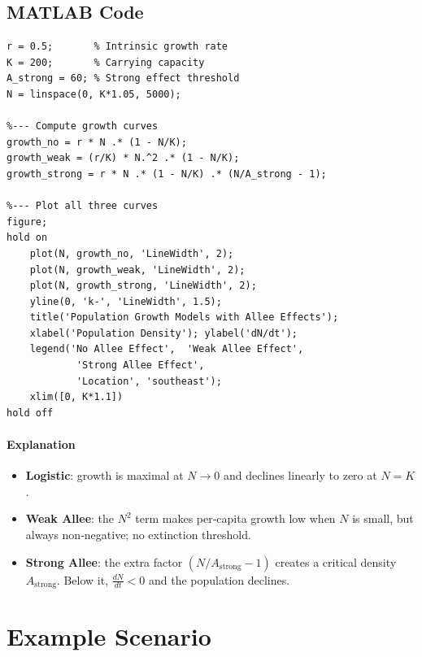 \documentclass{article}
\begin{document}
\subsection{MATLAB Code}
\begin{lstlisting}[caption={Analyze simulation results (Calculation part)}]
%--- Model parameters and density vector
r = 0.5;       % Intrinsic growth rate
K = 200;       % Carrying capacity
A_strong = 60; % Strong effect threshold
N = linspace(0, K*1.05, 5000);

%--- Compute growth curves
growth_no = r * N .* (1 - N/K);
growth_weak = (r/K) * N.^2 .* (1 - N/K);
growth_strong = r * N .* (1 - N/K) .* (N/A_strong - 1);

%--- Plot all three curves
figure;
hold on
    plot(N, growth_no, 'LineWidth', 2);
    plot(N, growth_weak, 'LineWidth', 2);
    plot(N, growth_strong, 'LineWidth', 2);
    yline(0, 'k-', 'LineWidth', 1.5); 
    title('Population Growth Models with Allee Effects');
    xlabel('Population Density'); ylabel('dN/dt');
    legend('No Allee Effect',  'Weak Allee Effect',
            'Strong Allee Effect', 
            'Location', 'southeast');
    xlim([0, K*1.1])
hold off
\end{lstlisting}

\paragraph{Explanation}
\begin{itemize}
  \item \textbf{Logistic}: growth is maximal at \(N\!\to\!0\) and declines linearly to zero at \(N=K\).
  \item \textbf{Weak Allee}: the \(N^2\) term makes per‐capita growth low when \(N\) is small, but always non‐negative; no extinction threshold.
  \item \textbf{Strong Allee}: the extra factor \((N/A_\text{strong}-1)\) creates a critical density \(A_\text{strong}\). Below it, \(\tfrac{dN}{dt}<0\) and the population declines.
\end{itemize}



\section{Example Scenario}
\end{document}
